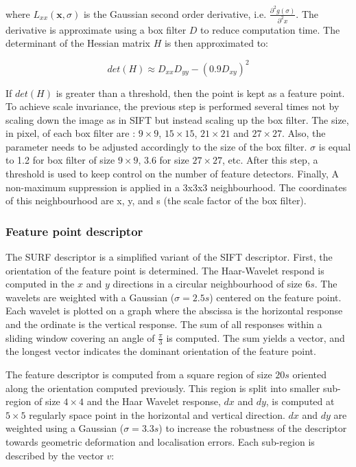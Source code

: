 \documentclass[11pt]{report}
\begin{document}
where $L_{xx}(\mathbf{x}, \sigma)$ is the Gaussian second order derivative, i.e. $\frac{\partial^2 g(\sigma)}{\partial^2 x}$. The derivative is approximate using a box filter $D$ to reduce computation time.  The determinant of the Hessian matrix $H$ is then approximated to:

\[
det(H) \approx D_{xx}D_{yy} - (0.9D_{xy})^2
\]

If $det(H)$ is greater than a threshold, then the point is kept as a feature point.
To achieve scale invariance, the previous step is performed several times not by scaling down the image as in SIFT\cite{Sift04} but instead scaling up the box filter. The size, in pixel, of each box filter are : $9\times9$, $15\times15$, $21\times21$ and $27\times27$.  Also, the parameter needs to be adjusted accordingly to the size of the box filter. $\sigma$ is equal to 1.2 for box filter of size $9\times9$, 3.6 for size $27\times27$, etc. After this step, a threshold is used to keep control on the number of feature detectors. Finally, A non-maximum suppression is applied in a 3x3x3 neighbourhood. The coordinates of this neighbourhood are x, y, and s (the scale factor of the box filter).

\subsubsection{Feature point descriptor}

The SURF descriptor is a simplified variant of the SIFT descriptor. First, the orientation of the feature point is determined. The Haar-Wavelet respond is computed in the $x$ and $y$ directions in a circular neighbourhood of size $6s$. The wavelets are weighted with a Gaussian ($\sigma = 2.5s$) centered on the feature point. Each wavelet is plotted on a graph where the abscissa is the horizontal response and the ordinate is the vertical response. The sum of all responses within a sliding window covering an angle of $\frac{\pi}{3}$ is computed. The sum yields a vector, and the longest vector indicates the dominant orientation of the feature point. 

The feature descriptor is computed from a square region of size $20s$ oriented along the orientation computed previously. This region is split into smaller sub-region of size $4\times4$ and the Haar Wavelet response, $dx$ and $dy$, is computed at  $5\times5$ regularly space point in the horizontal and vertical direction. $dx$ and $dy$ are weighted using a Gaussian ($\sigma=3.3s$) to increase the robustness of the descriptor towards geometric deformation and localisation errors. Each sub-region is described by the vector $v$:
\end{document}

